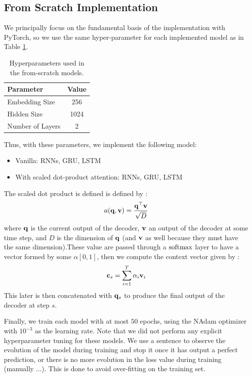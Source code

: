 \subsection{From Scratch Implementation}

We principally focus on the fundamental basis of the implementation with PyTorch, so we use the same hyper-parameter for each implemented model as in Table \ref{tab:hyper}.
\begin{table}[H]
	\centering
	\begin{tabular}{lc}
		\toprule
		Parameter & Value \\
		\midrule
		Embedding Size & 256 \\
		Hidden Size & 1024 \\
		Number of Layers & 2 \\
		\bottomrule
	\end{tabular}
	\caption{Hyperparameters used in the from-scratch models.}
	\label{tab:hyper}
\end{table}
Thus, with these parameters, we implement the following model:
\begin{itemize}
	\item Vanilla: RNNs, GRU, LSTM
	\item With scaled dot-product attention:  RNNs, GRU, LSTM
\end{itemize}
The scaled dot product is defined is defined by :
\begin{equation}
	a(\mathbf{q, v}) = \frac{\mathbf{q^\top v}}{\sqrt{D}}
\end{equation}
where $\mathbf{q}$ is the current output of the decoder, $\mathbf{v}$ an output of the decoder at some time step, and  $D$ is the dimension of $\mathbf{q}$ (and $\mathbf{v}$ as well because they must have the same dimension).These value are passed through a $\mathrm{softmax}$ layer to have a vector formed by some $\alpha[0,1]$, then we compute the context vector given by :
\begin{equation}
	\mathbf{c}_s = \sum_{i=1}^{T}\alpha_i \mathbf{v}_i
\end{equation}
This later is then concatenated with $\mathbf{q}_s$ to produce the final output of the decoder at step $s$.

Finally, we train each model with at most $50$ epochs, using the NAdam optimizer with $10^{-3}$ as the learning rate. Note that we did not perform any explicit hyperparameter tuning for these models. We use a sentence to observe the evolution of the model during training and stop it once it has output a perfect prediction, or there is no more evolution in the loss value during training (manually ...). This is done to avoid over-fitting on the training set.


